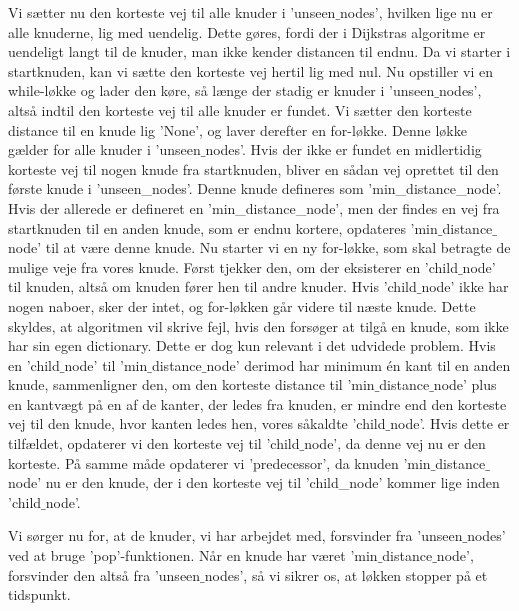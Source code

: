 Vi sætter nu den korteste vej til alle knuder i 'unseen$\_$nodes', hvilken lige nu er alle knuderne, lig med uendelig. Dette gøres, fordi der i Dijkstras algoritme er uendeligt langt til de knuder, man ikke kender distancen til endnu. Da vi starter i startknuden, kan vi sætte den korteste vej hertil lig med nul.
Nu opstiller vi en while-løkke og lader den køre, så længe der stadig er knuder i 'unseen$\_$nodes', altså indtil den korteste vej til alle knuder er fundet.
Vi sætter den korteste distance til en knude lig 'None', og laver derefter en for-løkke. Denne løkke gælder for alle knuder i 'unseen$\_$nodes'. Hvis der ikke er fundet en midlertidig korteste vej til nogen knude fra startknuden, bliver en sådan vej oprettet til den første knude i 'unseen\_nodes'. Denne knude defineres som 'min\_distance\_node'. Hvis der allerede er defineret en 'min\_distance\_node', men der findes en vej fra startknuden til en anden knude, som er endnu kortere, opdateres 'min$\_$distance$\_$node' til at være denne knude.
Nu starter vi en ny for-løkke, som skal betragte de mulige veje fra vores knude.
Først tjekker den, om der eksisterer en 'child$\_$node' til knuden, altså om knuden fører hen til andre knuder. Hvis 'child$\_$node' ikke har nogen naboer, sker der intet, og for-løkken går videre til næste knude. Dette skyldes, at algoritmen vil skrive fejl, hvis den forsøger at tilgå en knude, som ikke har sin egen dictionary. Dette er dog kun relevant i det udvidede problem.
Hvis en 'child$\_$node' til  'min$\_$distance$\_$node' derimod har minimum én kant til en anden knude, sammenligner den, om den korteste distance til 'min$\_$distance$\_$node' plus en kantvægt på en af de kanter, der ledes fra knuden, er mindre end den korteste vej til den knude, hvor kanten ledes hen, vores såkaldte 'child$\_$node'. Hvis dette er tilfældet, opdaterer vi den korteste vej til 'child$\_$node', da denne vej nu er den korteste. På samme måde opdaterer vi 'predecessor', da knuden 'min$\_$distance$\_$node' nu er den knude, der i den korteste vej til 'child\_node' kommer lige inden 'child$\_$node'.

Vi sørger nu for, at de knuder, vi har arbejdet med, forsvinder fra 'unseen$\_$nodes' ved at bruge 'pop'-funktionen. Når en knude har været 'min$\_$distance$\_$node', forsvinder den altså fra 'unseen$\_$nodes', så vi sikrer os, at løkken stopper på et tidspunkt. 

